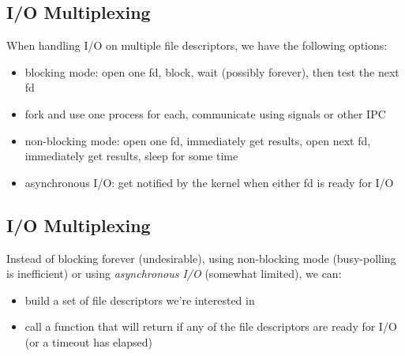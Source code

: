 \documentclass[xga]{xdvislides}
\begin{document}
\subsection{I/O Multiplexing}
When handling I/O on multiple file descriptors, we have the following
options:

\begin{itemize}
	\item blocking mode: open one fd, block, wait (possibly forever),
		then test the next fd
	\item fork and use one process for each, communicate using signals
		or other IPC
	\item non-blocking mode: open one fd, immediately get results,
		open next fd, immediately get results, sleep for some time
	\item asynchronous I/O: get notified by the kernel when either fd
		is ready for I/O
\end{itemize}

\subsection{I/O Multiplexing}
Instead of blocking forever (undesirable), using non-blocking mode
(busy-polling is inefficient) or using {\em asynchronous I/O} (somewhat
limited), we can:
\begin{itemize}
	\item build a set of file descriptors we're interested in
	\item call a function that will return if any of the file
		descriptors are ready for I/O (or a timeout has elapsed)
\end{itemize}
\end{document}
